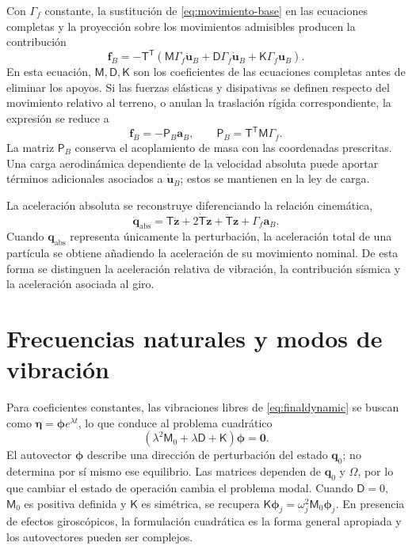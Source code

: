 \documentclass[11pt,a4paper,oneside]{report}
\newcommand{\vct}[1]{\bm{#1}}
\newcommand{\tr}{\mathsf T}
\begin{document}
Con $\mathsf\Gamma_f$ constante, la sustitución de \eqref{eq:movimiento-base} en las ecuaciones completas y la proyección sobre los movimientos admisibles producen la contribución
\begin{equation}
 \vct f_B=-\mathsf T^\tr\left(
 \mathsf M\mathsf\Gamma_f\ddot{\vct u}_B+
 \mathsf D\mathsf\Gamma_f\dot{\vct u}_B+
 \mathsf K\mathsf\Gamma_f\vct u_B\right).
 \label{eq:sismo-general}
\end{equation}
En esta ecuación, $\mathsf M,\mathsf D,\mathsf K$ son los coeficientes de las ecuaciones completas antes de eliminar los apoyos. Si las fuerzas elásticas y disipativas se definen respecto del movimiento relativo al terreno, o anulan la traslación rígida correspondiente, la expresión se reduce a
\begin{equation}
 \vct f_B=-\mathsf P_B\vct a_B,\qquad
 \mathsf P_B=\mathsf T^\tr\mathsf M\mathsf\Gamma_f.
 \label{eq:sismo-inercia}
\end{equation}
La matriz $\mathsf P_B$ conserva el acoplamiento de masa con las coordenadas prescritas. Una carga aerodinámica dependiente de la velocidad absoluta puede aportar términos adicionales asociados a $\dot{\vct u}_B$; estos se mantienen en la ley de carga.

La aceleración absoluta se reconstruye diferenciando la relación cinemática,
\begin{equation}
 \ddot{\vct q}_{\mathrm{abs}}
 =\mathsf T\ddot{\vct z}
  +2\dot{\mathsf T}\dot{\vct z}
  +\ddot{\mathsf T}\vct z
  +\mathsf\Gamma_f\vct a_B.
\end{equation}
Cuando $\vct q_{\mathrm{abs}}$ representa únicamente la perturbación, la aceleración total de una partícula se obtiene añadiendo la aceleración de su movimiento nominal. De esta forma se distinguen la aceleración relativa de vibración, la contribución sísmica y la aceleración asociada al giro.

\section{Frecuencias naturales y modos de vibración}
Para coeficientes constantes, las vibraciones libres de \eqref{eq:finaldynamic} se buscan como $\vct\eta=\vct\phi e^{\lambda t}$, lo que conduce al problema cuadrático \cite{tisseur}
\begin{equation}
 (\lambda^2\mathsf M_0+\lambda\mathsf D+\mathsf K)\vct\phi=\vct0.
\end{equation}
El autovector $\vct\phi$ describe una dirección de perturbación del estado $\vct q_0$; no determina por sí mismo ese equilibrio. Las matrices dependen de $\vct q_0$ y $\Omega$, por lo que cambiar el estado de operación cambia el problema modal. Cuando $\mathsf D=0$, $\mathsf M_0$ es positiva definida y $\mathsf K$ es simétrica, se recupera $\mathsf K\vct\phi_j=\omega_j^2\mathsf M_0\vct\phi_j$. En presencia de efectos giroscópicos, la formulación cuadrática es la forma general apropiada y los autovectores pueden ser complejos.
\end{document}
